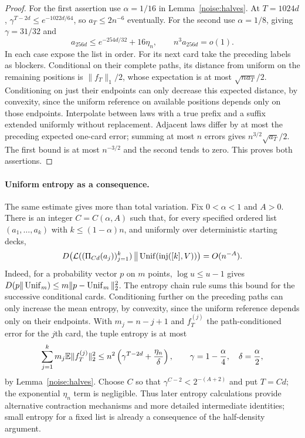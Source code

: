 \begin{proof}
For the first assertion use $\alpha=1/16$ in Lemma~\ref{noise:halves}.
At $T=1024d$,
$\gamma^{T-2d}\le e^{-1022d/64}$, so $a_T\le2n^{-6}$ eventually.
For the second use $\alpha=1/8$, giving $\gamma=31/32$ and
\[
 a_{256d}\le e^{-254d/32}+16\eta_n,
 \qquad n^3a_{256d}=o(1).
\]
In each case expose the list in order. For its next card take the
preceding labels as blockers. Conditional on their complete paths, its
distance from uniform on the remaining positions is
$\|f_T\|_1/2$, whose expectation is at most $\sqrt{na_T}/2$.
Conditioning on just their endpoints can only decrease this expected
distance, by convexity, since the uniform reference on available positions depends
only on those endpoints. Interpolate between laws with a true prefix
and a suffix extended uniformly without replacement. Adjacent laws
differ by at most the preceding expected one-card error; summing at
most $n$ errors gives $n^{3/2}\sqrt{a_T}/2$. The first bound is at most
$n^{-3/2}$ and the second tends to zero. This proves both assertions.
\end{proof}

\paragraph{Uniform entropy as a consequence.}
The same estimate gives more than total variation. Fix
$0<\alpha<1$ and $A>0$. There is an integer $C=C(\alpha,A)$ such
that, for every specified ordered list $(a_1,\ldots,a_k)$ with
$k\le(1-\alpha)n$, and uniformly over deterministic starting decks,
\begin{equation}\label{noise:uniform-entropy}
 D\!\left(\mathcal L((\Pi_{Cd}(a_j))_{j=1}^k)
       \,\middle\Vert\,\operatorname{Unif}(\operatorname{inj}([k],V))\right)
 =O(n^{-A}).
\end{equation}
Indeed, for a probability vector $p$ on $m$ points,
$\log u\le u-1$ gives
$D(p\Vert\operatorname{Unif}_m)\le m\|p-\operatorname{Unif}_m\|_2^2$.
The entropy chain rule sums this bound for the successive conditional
cards. Conditioning further on the preceding paths can only increase
the mean entropy, by convexity, since the uniform reference depends
only on their endpoints. With $m_j=n-j+1$ and $f_T^{(j)}$ the
path-conditioned error for the $j$th card, the tuple entropy is at most
\[
 \sum_{j=1}^k m_j\mathbb E\|f_T^{(j)}\|_2^2
 \le n^2\left(\gamma^{T-2d}+\frac{\eta_n}{\delta}\right),
 \qquad \gamma=1-\frac\alpha4,\quad\delta=\frac\alpha2,
\]
by Lemma~\ref{noise:halves}. Choose $C$ so that
$\gamma^{C-2}<2^{-(A+2)}$ and put $T=Cd$; the exponential
$\eta_n$ term is negligible. Thus later entropy calculations provide
alternative contraction mechanisms and more detailed intermediate
identities; small entropy for a fixed list is already a consequence
of the half-density argument.

